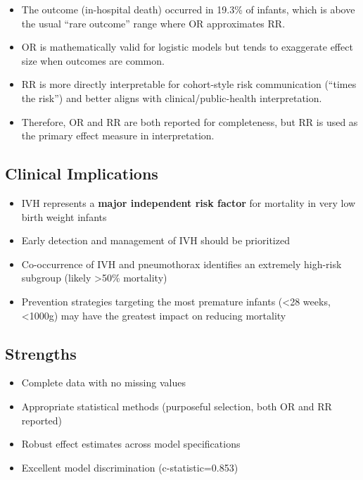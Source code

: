\documentclass[
]{article}
\providecommand{\tightlist}{%
  \setlength{\itemsep}{0pt}\setlength{\parskip}{0pt}}
\begin{document}
\begin{itemize}
\tightlist
\item
  The outcome (in-hospital death) occurred in 19.3\% of infants, which
  is above the usual ``rare outcome'' range where OR approximates RR.
\item
  OR is mathematically valid for logistic models but tends to exaggerate
  effect size when outcomes are common.
\item
  RR is more directly interpretable for cohort-style risk communication
  (``times the risk'') and better aligns with clinical/public-health
  interpretation.
\item
  Therefore, OR and RR are both reported for completeness, but RR is
  used as the primary effect measure in interpretation.
\end{itemize}

\hypertarget{clinical-implications}{%
\subsection{Clinical Implications}\label{clinical-implications}}

\begin{itemize}
\tightlist
\item
  IVH represents a \textbf{major independent risk factor} for mortality
  in very low birth weight infants
\item
  Early detection and management of IVH should be prioritized
\item
  Co-occurrence of IVH and pneumothorax identifies an extremely
  high-risk subgroup (likely \textgreater50\% mortality)
\item
  Prevention strategies targeting the most premature infants
  (\textless28 weeks, \textless1000g) may have the greatest impact on
  reducing mortality
\end{itemize}

\hypertarget{strengths}{%
\subsection{Strengths}\label{strengths}}

\begin{itemize}
\tightlist
\item
  Complete data with no missing values
\item
  Appropriate statistical methods (purposeful selection, both OR and RR
  reported)
\item
  Robust effect estimates across model specifications
\item
  Excellent model discrimination (c-statistic=0.853)
\end{itemize}
\end{document}
